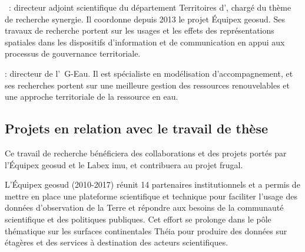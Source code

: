  : directeur adjoint scientifique du département Territoires d'{\IRSTEA}, chargé du thème de recherche {\sc synergie}.
Il coordonne depuis 2013 le projet Équipex {\sc geosud}. Ses travaux de recherche portent sur les usages et les effets
des représentations spatiales dans les dispositifs d'information et de communication en appui aux processus de gouvernance territoriale.

 : directeur de l'{\UMR\ G-Eau}.
Il est spécialiste en modélisation d'accompagnement,
et ses recherches portent sur une meilleure gestion des ressources renouvelables
et une approche territoriale de la ressource en eau.


\subsection{Projets en relation avec le travail de thèse}


Ce travail de recherche bénéficiera des collaborations et des projets portés
par l'Équipex {\sc geosud} et le Labex {\sc imu},
et contribuera au projet {\sc frugal}.

L'Équipex {\sc geosud} (2010-2017) réunit 14 partenaires institutionnels et a permis de mettre en place une plateforme
scientifique et technique pour faciliter l'usage des données d'observation de la Terre et répondre aux besoins
de la communauté scientifique et des politiques publiques.
Cet effort se prolonge dans le pôle thématique sur les surfaces continentales Théia
pour produire des données sur étagères et des services à destination des acteurs scientifiques.

